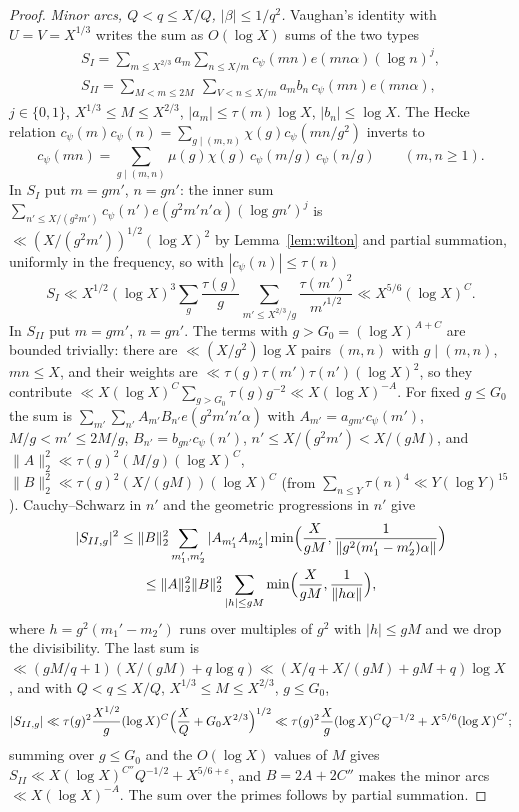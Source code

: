 \documentclass[11pt]{amsart}
\theoremstyle{remark}
\newcommand{\e}{\varepsilon}
\begin{document}
\begin{proof}
\emph{Minor arcs, $Q<q\le X/Q$, $|\beta|\le1/q^2$.} Vaughan's identity with $U=V=X^{1/3}$ \cite[Chapter~24]{Davenport} writes the sum as $O(\log X)$ sums of the two types
\begin{gather*}
S_I=\sum_{m\le X^{2/3}}a_m\sum_{n\le X/m}c_\psi(mn)e(mn\alpha)(\log n)^j,\\ S_{II}=\sum_{M<m\le2M}\ \sum_{V<n\le X/m}a_mb_n\,c_\psi(mn)e(mn\alpha),
\end{gather*}
$j\in\{0,1\}$, $X^{1/3}\le M\le X^{2/3}$, $|a_m|\le\tau(m)\log X$, $|b_n|\le\log X$. The Hecke relation $c_\psi(m)c_\psi(n)=\sum_{g\mid(m,n)}\chi(g)c_\psi(mn/g^2)$ inverts to
\begin{equation}\label{eq:hecke}
c_\psi(mn)=\sum_{g\mid(m,n)}\mu(g)\chi(g)\,c_\psi(m/g)\,c_\psi(n/g)\qquad(m,n\ge1).
\end{equation}
In $S_I$ put $m=gm'$, $n=gn'$: the inner sum $\sum_{n'\le X/(g^2m')}c_\psi(n')e(g^2m'n'\alpha)(\log gn')^j$ is $\ll(X/(g^2m'))^{1/2}(\log X)^2$ by Lemma~\ref{lem:wilton} and partial summation, uniformly in the frequency, so with $|c_\psi(n)|\le\tau(n)$
\[
S_I\ll X^{1/2}(\log X)^3\sum_g\frac{\tau(g)}g\sum_{m'\le X^{2/3}/g}\frac{\tau(m')^2}{m'^{1/2}}\ll X^{5/6}(\log X)^C.
\]
In $S_{II}$ put $m=gm'$, $n=gn'$. The terms with $g>G_0=(\log X)^{A+C}$ are bounded trivially: there are $\ll(X/g^2)\log X$ pairs $(m,n)$ with $g\mid(m,n)$, $mn\le X$, and their weights are $\ll\tau(g)\tau(m')\tau(n')(\log X)^2$, so they contribute $\ll X(\log X)^{C}\sum_{g>G_0}\tau(g)g^{-2}\ll X(\log X)^{-A}$. For fixed $g\le G_0$ the sum is $\sum_{m'}\sum_{n'}A_{m'}B_{n'}e(g^2m'n'\alpha)$ with $A_{m'}=a_{gm'}c_\psi(m')$, $M/g<m'\le2M/g$, $B_{n'}=b_{gn'}c_\psi(n')$, $n'\le X/(g^2m')<X/(gM)$, and $\|A\|_2^2\ll\tau(g)^2(M/g)(\log X)^C$, $\|B\|_2^2\ll\tau(g)^2(X/(gM))(\log X)^C$ (from $\sum_{n\le Y}\tau(n)^4\ll Y(\log Y)^{15}$). Cauchy--Schwarz in $n'$ and the geometric progressions in $n'$ give
\begin{multline*}
|S_{II,g}|^2\le\|B\|_2^2\sum_{m_1',m_2'}|A_{m_1'}A_{m_2'}|\min\Bigl(\frac X{gM},\frac1{\|g^2(m_1'-m_2')\alpha\|}\Bigr)\\
\le\|A\|_2^2\|B\|_2^2\sum_{|h|\le gM}\min\Bigl(\frac X{gM},\frac1{\|h\alpha\|}\Bigr),
\end{multline*}
where $h=g^2(m_1'-m_2')$ runs over multiples of $g^2$ with $|h|\le gM$ and we drop the divisibility. The last sum is $\ll(gM/q+1)(X/(gM)+q\log q)\ll(X/q+X/(gM)+gM+q)\log X$ \cite[Chapter~25]{Davenport}, and with $Q<q\le X/Q$, $X^{1/3}\le M\le X^{2/3}$, $g\le G_0$,
\[
|S_{II,g}|\ll\tau(g)^2\frac{X^{1/2}}g(\log X)^C\Bigl(\frac XQ+G_0X^{2/3}\Bigr)^{1/2}\ll\tau(g)^2\frac Xg(\log X)^CQ^{-1/2}+X^{5/6}(\log X)^{C'};
\]
summing over $g\le G_0$ and the $O(\log X)$ values of $M$ gives $S_{II}\ll X(\log X)^{C''}Q^{-1/2}+X^{5/6+\e}$, and $B=2A+2C''$ makes the minor arcs $\ll X(\log X)^{-A}$. The sum over the primes follows by partial summation.
\end{proof}
\end{document}
